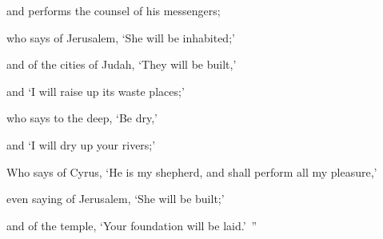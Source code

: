 {\par }{\QB and performs the counsel of his messengers;
\par }{\Q who says of Jerusalem, ‘She will be inhabited;’
\par }{\QB and of the cities of Judah, ‘They will be built,’
\par }{\QB and ‘I will raise up its waste places;’
\par }{\Q {}who says to the deep, ‘Be dry,’
\par }{\QB and ‘I will dry up your rivers;’
\par }{\Q {}Who says of Cyrus, ‘He is my shepherd, and shall perform all my pleasure,’
\par }{\QB even saying of Jerusalem, ‘She will be built;’
\par }{\QB and of the temple, ‘Your foundation will be laid.’ ”

}
